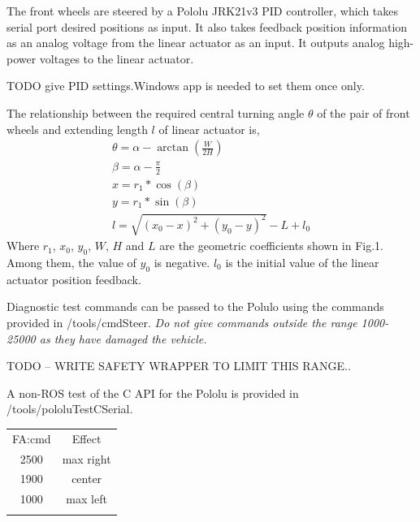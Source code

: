 \documentclass[a4paper]{article}
\begin{document}
The front wheels are steered by a Pololu JRK21v3 PID controller, which takes serial port desired positions as input. It also takes feedback position information as an analog voltage from the linear actuator as an input. It outputs analog high-power voltages to the linear actuator.

TODO give PID settings.Windows app is needed to set them once only. 



The relationship between the required central turning angle $\theta$ of the pair of front wheels and extending length $l$ of linear actuator is,    
\begin{gather}
\theta = \alpha - \arctan(\frac{W}{2H}) \\
\beta = \alpha -\frac{\pi}{2}\\
x = r_1 * \cos(\beta) \\
y = r_1 * \sin(\beta) \\
l = \sqrt{(x_0-x)^2 + (y_0-y)^2} - L + l_0    
\end{gather}    
Where $r_1$, $x_0$, $y_0$, $W$, $H$ and $L$ are the geometric coefficients shown in Fig.1. Among them, the value of $y_0$ is negative. $l_0$ is the initial value of the linear actuator position feedback.


Diagnostic test commands can be passed to the Polulo using the commands provided in /tools/cmdSteer.   {\em Do not give commands outside the range 1000-25000 as they have damaged the vehicle.}  

TODO -- WRITE SAFETY WRAPPER TO LIMIT THIS RANGE..

A non-ROS test of the C API for the Pololu is provided in /tools/pololuTestCSerial.    

\begin{center}
	\begin{tabular}{ c c }
		\hline
		FA:cmd     &  Effect \\
		2500    &    max right  \\
		1900    &    center  \\ 
		1000    &    max left  \\
		\hline\\
	\end{tabular}
\end{center}    
\end{document}
